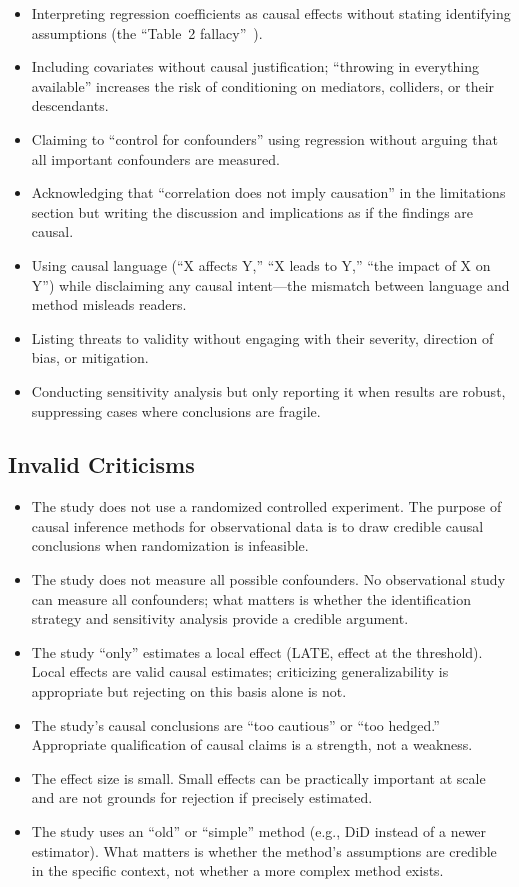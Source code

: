 \begin{itemize}[leftmargin=15pt]
    \item Interpreting regression coefficients as causal effects without stating identifying assumptions (the ``Table~2 fallacy''~\cite{westreich2013table2}).
    \item Including covariates without causal justification; ``throwing in everything available'' increases the risk of conditioning on mediators, colliders, or their descendants.
    \item Claiming to ``control for confounders'' using regression without arguing that all important confounders are measured.
    \item Acknowledging that ``correlation does not imply causation'' in the limitations section but writing the discussion and implications as if the findings are causal.
    \item Using causal language (``X affects Y,'' ``X leads to Y,'' ``the impact of X on Y'') while disclaiming any causal intent---the mismatch between language and method misleads readers.
    \item Listing threats to validity without engaging with their severity, direction of bias, or mitigation.
    \item Conducting sensitivity analysis but only reporting it when results are robust, suppressing cases where conclusions are fragile.
\end{itemize}

\subsection{Invalid Criticisms}

\begin{itemize}[leftmargin=15pt]
    \item The study does not use a randomized controlled experiment.
    The purpose of causal inference methods for observational data is to draw credible causal conclusions when randomization is infeasible.
    \item The study does not measure all possible confounders.
    No observational study can measure all confounders; what matters is whether the identification strategy and sensitivity analysis provide a credible argument.
    \item The study ``only'' estimates a local effect (LATE, effect at the threshold).
    Local effects are valid causal estimates; criticizing generalizability is appropriate but rejecting on this basis alone is not.
    \item The study's causal conclusions are ``too cautious'' or ``too hedged.''
    Appropriate qualification of causal claims is a strength, not a weakness.
    \item The effect size is small.
    Small effects can be practically important at scale and are not grounds for rejection if precisely estimated.
    \item The study uses an ``old'' or ``simple'' method (e.g., DiD instead of a newer estimator).
    What matters is whether the method's assumptions are credible in the specific context, not whether a more complex method exists.
\end{itemize}

